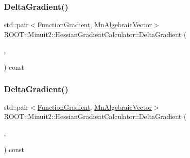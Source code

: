 \subsubsection{\texorpdfstring{DeltaGradient()}{DeltaGradient()}\hspace{0.1cm}{\footnotesize\ttfamily [2/3]}}
{\footnotesize\ttfamily std\+::pair$<$\mbox{\hyperlink{classROOT_1_1Minuit2_1_1FunctionGradient}{Function\+Gradient}}, \mbox{\hyperlink{namespaceROOT_1_1Minuit2_a62ed97730a1ca8d3fbaec64a19aa11c9}{Mn\+Algebraic\+Vector}}$>$ R\+O\+O\+T\+::\+Minuit2\+::\+Hessian\+Gradient\+Calculator\+::\+Delta\+Gradient (\begin{DoxyParamCaption}\item[{const \mbox{\hyperlink{classROOT_1_1Minuit2_1_1MinimumParameters}{Minimum\+Parameters}} \&}]{,  }\item[{const \mbox{\hyperlink{classROOT_1_1Minuit2_1_1FunctionGradient}{Function\+Gradient}} \&}]{ }\end{DoxyParamCaption}) const}

\mbox{\label{classROOT_1_1Minuit2_1_1HessianGradientCalculator_a808c1f808c436fbb6b67cb8af13d0480}} 
\subsubsection{\texorpdfstring{DeltaGradient()}{DeltaGradient()}\hspace{0.1cm}{\footnotesize\ttfamily [3/3]}}
{\footnotesize\ttfamily std\+::pair$<$\mbox{\hyperlink{classROOT_1_1Minuit2_1_1FunctionGradient}{Function\+Gradient}}, \mbox{\hyperlink{namespaceROOT_1_1Minuit2_a62ed97730a1ca8d3fbaec64a19aa11c9}{Mn\+Algebraic\+Vector}}$>$ R\+O\+O\+T\+::\+Minuit2\+::\+Hessian\+Gradient\+Calculator\+::\+Delta\+Gradient (\begin{DoxyParamCaption}\item[{const \mbox{\hyperlink{classROOT_1_1Minuit2_1_1MinimumParameters}{Minimum\+Parameters}} \&}]{,  }\item[{const \mbox{\hyperlink{classROOT_1_1Minuit2_1_1FunctionGradient}{Function\+Gradient}} \&}]{ }\end{DoxyParamCaption}) const}

\mbox{\label{classROOT_1_1Minuit2_1_1HessianGradientCalculator_ae23f4348f9a64595c39db48aa48d9e09}} 
